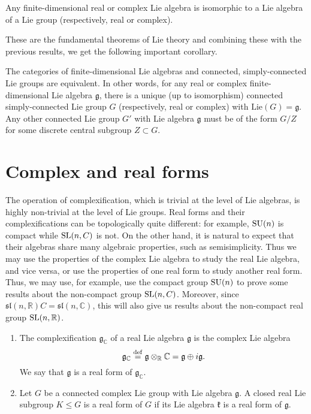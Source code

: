 \documentclass{report}
\begin{document}
\begin{theorem}
Any finite-dimensional real or complex Lie algebra is isomorphic to a Lie algebra of a Lie group (respectively, real or complex).
\end{theorem}

These are the fundamental theorems of Lie theory and combining these with the previous results, we get the following important corollary.

\begin{corollary}
    The categories of finite-dimensional Lie algebras and connected, simply-connected Lie groups are equivalent.
    In other words, for any real or complex finite-dimensional Lie algebra $\mathfrak{g}$, there is a unique (up to isomorphism) connected simply-connected Lie group $G$ (respectively, real or complex) with $\text{Lie}(G) = \mathfrak{g}$. Any other connected Lie group $G'$ with Lie algebra $\mathfrak{g}$ must be of the form $G/Z$ for some discrete central subgroup $Z \subset G$.
\end{corollary}

\section{Complex and real forms}
The operation of complexiﬁcation, which is trivial at the level of Lie algebras,
is highly non-trivial at the level of Lie groups.
Real forms and their complexifications can be topologically quite different: for example, $\operatorname{{\mathrm{SU}}}(n)$ is compact while $\operatorname{{\mathrm{SL}}}(n, C)$ is not. On the other hand, it is natural to expect that their algebras share many algebraic properties, such as semisimplicity.
Thus we may use the properties of the complex Lie algebra to study the real Lie algebra, and vice versa, or use the properties of one real form to study another real form.
Thus, we may use, for example, use the compact group $\operatorname{{\mathrm{SU}}}(n)$ to prove some results
about the non-compact group $\operatorname{{\mathrm{SL}}}(n, C)$. Moreover, since $\mathfrak{sl}(n, \mathbb R)C = \mathfrak{sl}(n, \mathbb C)$,
this will also give us results about the non-compact real group $\operatorname{{\mathrm{SL}}}(n, \mathbb R)$. 

\begin{definition}
    \begin{enumerate}[label = (\roman*)]
        \item 
        The complexification $\mathfrak g_{\mathbb C}$ of a real Lie algebra $\mathfrak g$ is the complex Lie algebra
    \[
    \mathfrak g_{\mathbb C} \overset{\mathrm{def}}{=} \mathfrak g \otimes_{\mathbb R} \mathbb C = \mathfrak g \oplus i \mathfrak g.
    \]
    We say that $\mathfrak g$ is a real form of $\mathfrak g_{\mathbb C}$.
    \item
    Let $G$ be a connected complex Lie group with Lie algebra $\mathfrak g$. 
    A closed real Lie subgroup $K \leq G$ is a real form of $G$ if its Lie algebra $\mathfrak k$ is a real form of $\mathfrak g$.
    \end{enumerate}
\end{definition}
\end{document}
